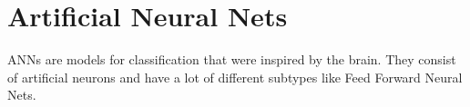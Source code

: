 \chapter{Artificial Neural Nets}\label{ch:ANNs}

\Glspl{ANN} are models for classification that were inspired by the brain.
They consist of artificial neurons and have a lot of different subtypes like
Feed Forward Neural Nets.



